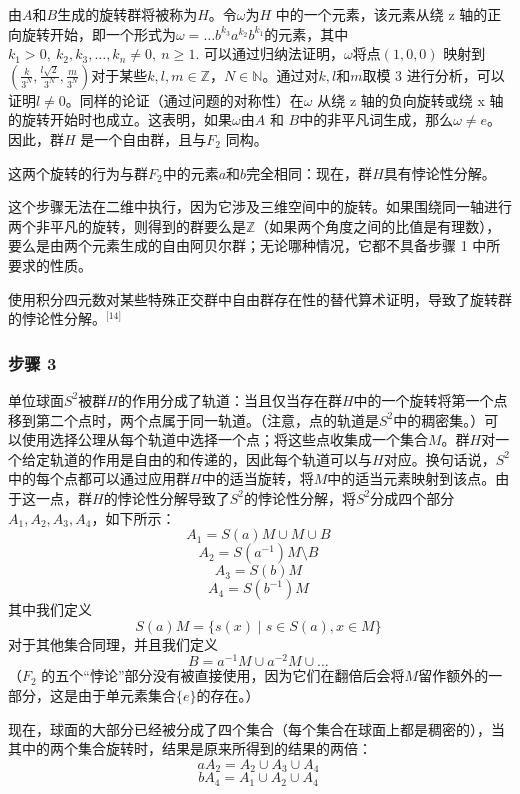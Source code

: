 由\( A \)和\( B \)生成的旋转群将被称为\( H \)。令\( \omega \)为\( H \) 中的一个元素，该元素从绕 z 轴的正向旋转开始，即一个形式为\(\omega = \ldots b^{k_3} a^{k_2} b^{k_1}\)的元素，其中\(k_1 > 0,\ k_2, k_3, \ldots, k_n \neq 0,\ n \geq 1\). 可以通过归纳法证明，\( \omega \)将点\( (1, 0, 0) \) 映射到\(\left( \frac{k}{3^N}, \frac{l \sqrt{2}}{3^N}, \frac{m}{3^N} \right)\)对于某些\( k, l, m \in \mathbb{Z} \)，\( N \in \mathbb{N} \)。通过对\( k, l \)和\( m \)取模 3 进行分析，可以证明\( l \neq 0 \)。同样的论证（通过问题的对称性）在\( \omega \) 从绕 z 轴的负向旋转或绕 x 轴的旋转开始时也成立。这表明，如果\( \omega \)由\( A \) 和 \( B \)中的非平凡词生成，那么\( \omega \neq e \)。因此，群\( H \) 是一个自由群，且与\( F_2 \) 同构。

这两个旋转的行为与群\( F_2 \)中的元素\( a \)和\( b \)完全相同：现在，群\( H \)具有悖论性分解。

这个步骤无法在二维中执行，因为它涉及三维空间中的旋转。如果围绕同一轴进行两个非平凡的旋转，则得到的群要么是\( \mathbb{Z} \)（如果两个角度之间的比值是有理数），要么是由两个元素生成的自由阿贝尔群；无论哪种情况，它都不具备步骤 1 中所要求的性质。

使用积分四元数对某些特殊正交群中自由群存在性的替代算术证明，导致了旋转群的悖论性分解。\(^\text{[14]}\)
\subsubsection{步骤 3}  
单位球面\( S^2 \)被群\( H \)的作用分成了轨道：当且仅当存在群\( H \)中的一个旋转将第一个点移到第二个点时，两个点属于同一轨道。（注意，点的轨道是\( S^2 \)中的稠密集。）可以使用选择公理从每个轨道中选择一个点；将这些点收集成一个集合\( M \)。群\( H \)对一个给定轨道的作用是自由的和传递的，因此每个轨道可以与\( H \)对应。换句话说，\( S^2 \)中的每个点都可以通过应用群\( H \)中的适当旋转，将\( M \)中的适当元素映射到该点。由于这一点，群\( H \)的悖论性分解导致了\( S^2 \)的悖论性分解，将\( S^2 \)分成四个部分\( A_1, A_2, A_3, A_4 \)，如下所示：
\[
A_1 = S(a)M \cup M \cup B~
\]
\[
A_2 = S(a^{-1})M \setminus B~
\]
\[
A_3 = S(b)M~
\]
\[
A_4 = S(b^{-1})M~
\]
其中我们定义
\[
S(a)M = \{ s(x) \mid s \in S(a), x \in M \}~
\]
对于其他集合同理，并且我们定义
\[
B = a^{-1}M \cup a^{-2}M \cup \dots~
\]
（\( F_2 \) 的五个“悖论”部分没有被直接使用，因为它们在翻倍后会将\( M \)留作额外的一部分，这是由于单元素集合\( \{e\} \)的存在。）

现在，球面的大部分已经被分成了四个集合（每个集合在球面上都是稠密的），当其中的两个集合旋转时，结果是原来所得到的结果的两倍：
\[
aA_2 = A_2 \cup A_3 \cup A_4~
\]
\[
bA_4 = A_1 \cup A_2 \cup A_4~
\]
